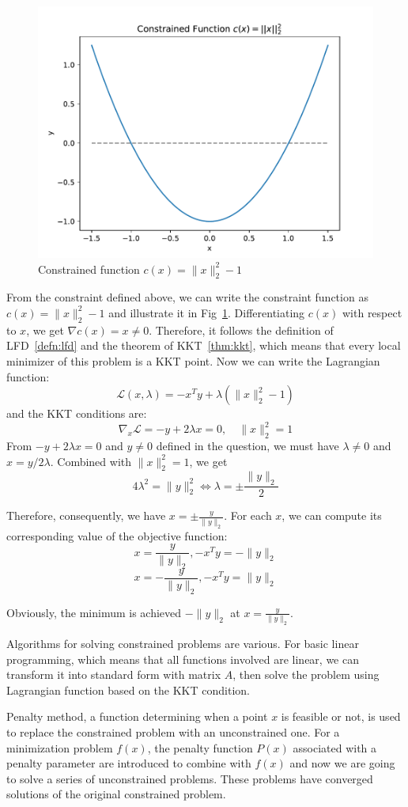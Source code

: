 \begin{figure}[t]
    \label{fig:example23_cons}
    \centering
    \includegraphics[page=1,width=.7\textwidth]{figs/constrained_22.pdf} 
  \caption{Constrained function $c(x) = \|x\|_{2}^{2} - 1$}
 \end{figure}

\par From the constraint defined above, we can write the constraint function as $c(x) = \|x\|_{2}^{2} - 1$ and illustrate it in Fig~\ref{fig:example23_cons}.  Differentiating $c(x)$ with respect to $x$, we get $\nabla c(x) = x \neq 0$. Therefore, it follows the definition of LFD~\ref{defn:lfd} and the theorem of KKT~\ref{thm:kkt}, which means that every local minimizer of this problem is a KKT point. Now we can write the Lagrangian function:
$$
\mathcal{L}(x, \lambda)=-x^{T} y+\lambda\left(\|x\|_{2}^{2}-1\right)
$$
and the KKT conditions are:
$$
\nabla_x \mathcal{L} = -y+2\lambda x = 0, \quad \|x\|_{2}^{2} = 1
$$
From $-y+2\lambda x = 0$ and $y \neq 0$ defined in the question, we must have $\lambda \neq 0$ and $x = y / 2\lambda$. Combined with $\|x\|_{2}^{2} = 1$, we get 
$$ 
4 \lambda^{2}=\|y\|_{2}^{2} \Leftrightarrow \lambda=\pm \frac{\|y\|_{2}}{2}
$$
\par Therefore, consequently, we have $x = \pm \frac{y}{\|y\|_{2}}$. For each $x$, we can compute its corresponding value of the objective function:
$$
x = \frac{y}{\|y\|_{2}}, -x^{T} y=-\|y\|_{2}
$$
$$
x = -\frac{y}{\|y\|_{2}}, -x^{T} y=\|y\|_{2}
$$ 
\par Obviously, the minimum is achieved $-\|y\|_{2}$ at $x = \frac{y}{\|y\|_{2}}$. 
\par Algorithms for solving constrained problems are various. For basic linear programming, which means that all functions involved are linear, we can transform it into standard form with matrix $A$, then solve the problem using Lagrangian function based on the KKT condition. 
\par Penalty method\citep{YO:05}, a function determining when a point $x$ is feasible or not, is used to replace the constrained problem with an unconstrained one. For a minimization problem $f(x)$, the penalty function $P(x)$ associated with a penalty parameter are introduced to combine with $f(x)$ and now we are going to solve a series of unconstrained problems. These problems have converged solutions of the original constrained problem. 

